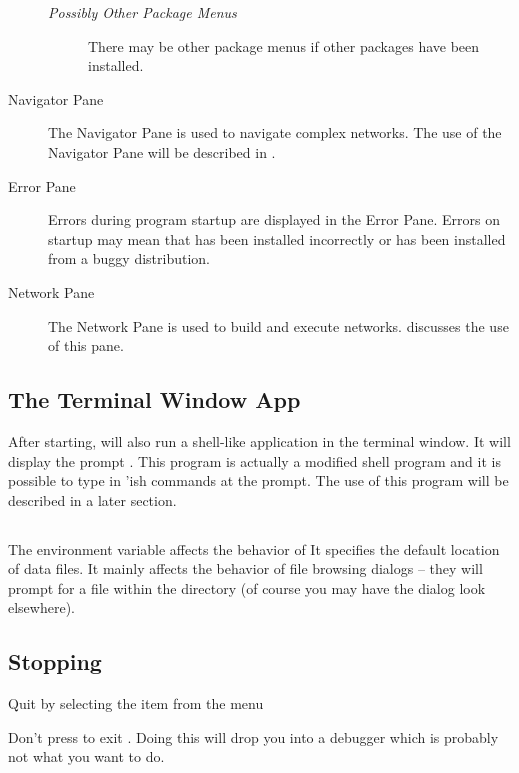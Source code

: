 \begin{description}
  \begin{description}
  \item [\textit{Possibly Other Package Menus}] There may be other package
    menus if other packages have been installed.
  \end{description}

\item[Navigator Pane] The Navigator Pane is used to navigate complex
  networks.  The use of the Navigator Pane will be described in
  .
  
\item[Error Pane] Errors during program startup are displayed in the Error
  Pane.  Errors on startup may mean that \sr{} has been installed
  incorrectly or has been installed from a buggy distribution.
  
\item[Network Pane] The Network Pane is used to build and execute networks.
   discusses the use of this
  pane.

\end{description}

\subsection{The Terminal Window App}
\label{sec:termwinapp}

After starting, \sr{} will also run a shell-like application in the terminal
window.  It will display the prompt .  This program is
actually a modified  shell program and it
is possible to type in 'ish \sr{} commands at the prompt. The
use of this program will be described in a later section.


\subsection{}
\label{sec:scirundata}

The environment variable  affects the behavior of \sr{} 
It specifies the default location of \sr{} data files.  It mainly affects
the behavior of file browsing dialogs -- they will prompt for a file within
the  directory (of course you may have the dialog look
elsewhere).


\subsection{Stopping}
\label{sec:stopping}

Quit \sr{} by selecting the  item from the  menu

Don't press  to exit \sr.  Doing this will drop you into
a debugger which is probably not what you want to do.


